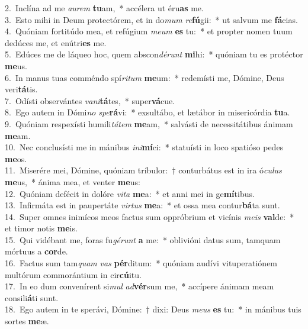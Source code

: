 {2.~}Inclína ad me \textit{au}\textit{rem} \textbf{tu}am,~* accélera ut éru\textbf{as} me.\\
{3.~}Esto mihi in Deum protectórem, et in do\textit{mum} \textit{re}\textbf{fú}gii:~* ut salvum me \textbf{fá}cias.\\
{4.~}Quóniam fortitúdo mea, et refúgium \textit{me}\textit{um} \textbf{es} tu:~* et propter nomen tuum dedúces me, et enútri\textbf{es} me.\\
{5.~}Edúces me de láqueo hoc, quem abscon\textit{dé}\textit{runt} \textbf{mi}hi:~* quóniam tu es protéctor \textbf{me}us.\\
{6.~}In manus tuas comméndo spí\textit{ri}\textit{tum} \textbf{me}um:~* redemísti me, Dómine, Deus veri\textbf{tá}tis.\\
{7.~}Odísti observántes \textit{va}\textit{ni}\textbf{tá}tes,~* super\textbf{vá}cue.\\
{8.~}Ego autem in Dómi\textit{no} \textit{spe}\textbf{rá}vi:~* exsultábo, et lætábor in misericórdia \textbf{tu}a.\\
{9.~}Quóniam respexísti humili\textit{tá}\textit{tem} \textbf{me}am,~* salvásti de necessitátibus ánimam \textbf{me}am.\\
{10.~}Nec conclusísti me in mánibus \textit{i}\textit{ni}\textbf{mí}ci:~* statuísti in loco spatióso pedes \textbf{me}os.\\
{11.~}Miserére mei, Dómine, quóniam tríbulor:~† conturbátus est in ira ó\textit{cu}\textit{lus} \textbf{me}us,~* ánima mea, et venter \textbf{me}us:\\
{12.~}Quóniam defécit in dolóre \textit{vi}\textit{ta} \textbf{me}a:~* et anni mei in ge\textbf{mí}tibus.\\
{13.~}Infirmáta est in paupertáte \textit{vir}\textit{tus} \textbf{me}a:~* et ossa mea contur\textbf{bá}ta sunt.\\
{14.~}Super omnes inimícos meos factus sum oppróbrium et vicínis \textit{me}\textit{is} \textbf{val}de:~* et timor notis \textbf{me}is.\\
{15.~}Qui vidébant me, foras fu\textit{gé}\textit{runt} \textbf{a} me:~* oblivióni datus sum, tamquam mórtuus a \textbf{cor}de.\\
{16.~}Factus sum tam\textit{quam} \textit{vas} \textbf{pér}ditum:~* quóniam audívi vituperatiónem multórum commorántium in cir\textbf{cú}itu.\\
{17.~}In eo dum convenírent si\textit{mul} \textit{ad}\textbf{vér}sum me,~* accípere ánimam meam consili\textbf{á}ti sunt.\\
{18.~}Ego autem in te sperávi, Dómine:~† dixi: Deus \textit{me}\textit{us} \textbf{es} tu:~* in mánibus tuis sortes \textbf{me}æ.\\
